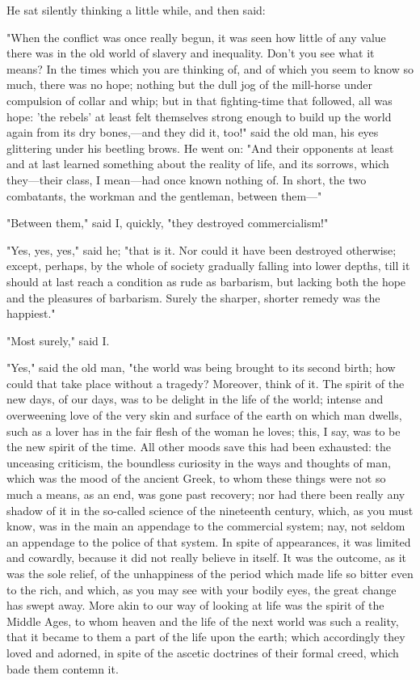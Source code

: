 He sat silently thinking a little while, and then said:

"When the conflict was once really begun, it was seen how little of any
value there was in the old world of slavery and inequality. Don't you
see what it means? In the times which you are thinking of, and of which
you seem to know so much, there was no hope; nothing but the dull jog of
the mill-horse under compulsion of collar and whip; but in that
fighting-time that followed, all was hope: 'the rebels' at least felt
themselves strong enough to build up the world again from its dry
bones,---and they did it, too!" said the old man, his eyes glittering
under his beetling brows. He went on: "And their opponents at least and
at last learned something about the reality of life, and its sorrows,
which they---their class, I mean---had once known nothing of. In short,
the two combatants, the workman and the gentleman, between them---"

"Between them," said I, quickly, "they destroyed commercialism!"

"Yes, yes, yes," said he; "that is it. Nor could it have been destroyed
otherwise; except, perhaps, by the whole of society gradually falling
into lower depths, till it should at last reach a condition as rude as
barbarism, but lacking both the hope and the pleasures of barbarism.
Surely the sharper, shorter remedy was the happiest."

"Most surely," said I.

"Yes," said the old man, "the world was being brought to its second
birth; how could that take place without a tragedy? Moreover, think of
it. The spirit of the new days, of our days, was to be delight in the
life of the world; intense and overweening love of the very skin and
surface of the earth on which man dwells, such as a lover has in the
fair flesh of the woman he loves; this, I say, was to be the new spirit
of the time. All other moods save this had been exhausted: the unceasing
criticism, the boundless curiosity in the ways and thoughts of man,
which was the mood of the ancient Greek, to whom these things were not
so much a means, as an end, was gone past recovery; nor had there been
really any shadow of it in the so-called science of the nineteenth
century, which, as you must know, was in the main an appendage to the
commercial system; nay, not seldom an appendage to the police of that
system. In spite of appearances, it was limited and cowardly, because it
did not really believe in itself. It was the outcome, as it was the sole
relief, of the unhappiness of the period which made life so bitter even
to the rich, and which, as you may see with your bodily eyes, the great
change has swept away. More akin to our way of looking at life was the
spirit of the Middle Ages, to whom heaven and the life of the next world
was such a reality, that it became to them a part of the life upon the
earth; which accordingly they loved and adorned, in spite of the ascetic
doctrines of their formal creed, which bade them contemn it.

